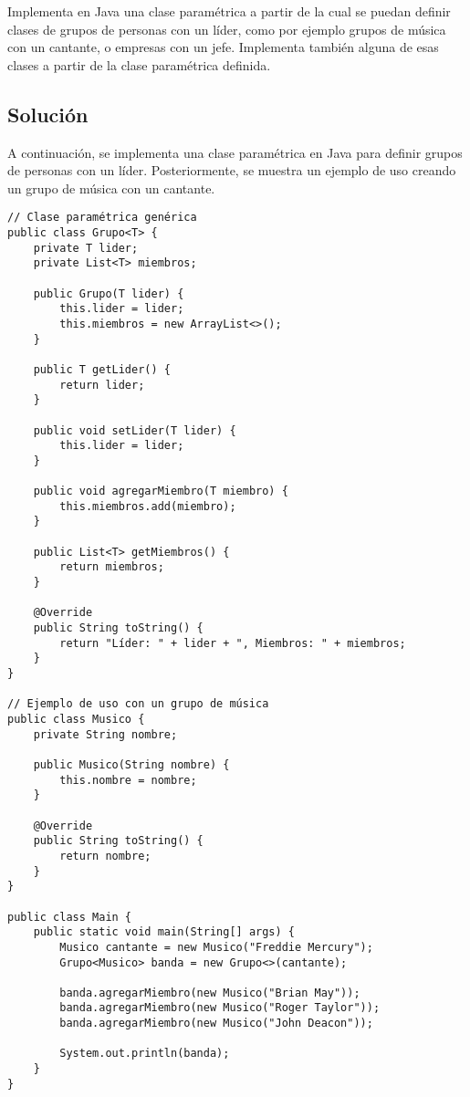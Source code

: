 \documentclass[a4paper,12pt]{article}
\begin{document}
Implementa en Java una clase paramétrica a partir de la cual se puedan definir clases de grupos de personas con un líder, como por ejemplo grupos de música con un cantante, o empresas con un jefe. Implementa también alguna de esas clases a partir de la clase paramétrica definida.

\subsection{Solución}

A continuación, se implementa una clase paramétrica en Java para definir grupos de personas con un líder. Posteriormente, se muestra un ejemplo de uso creando un grupo de música con un cantante.

\begin{lstlisting}[style=customjava]
// Clase paramétrica genérica
public class Grupo<T> {
    private T lider;
    private List<T> miembros;

    public Grupo(T lider) {
        this.lider = lider;
        this.miembros = new ArrayList<>();
    }

    public T getLider() {
        return lider;
    }

    public void setLider(T lider) {
        this.lider = lider;
    }

    public void agregarMiembro(T miembro) {
        this.miembros.add(miembro);
    }

    public List<T> getMiembros() {
        return miembros;
    }

    @Override
    public String toString() {
        return "Líder: " + lider + ", Miembros: " + miembros;
    }
}

// Ejemplo de uso con un grupo de música
public class Musico {
    private String nombre;

    public Musico(String nombre) {
        this.nombre = nombre;
    }

    @Override
    public String toString() {
        return nombre;
    }
}

public class Main {
    public static void main(String[] args) {
        Musico cantante = new Musico("Freddie Mercury");
        Grupo<Musico> banda = new Grupo<>(cantante);
        
        banda.agregarMiembro(new Musico("Brian May"));
        banda.agregarMiembro(new Musico("Roger Taylor"));
        banda.agregarMiembro(new Musico("John Deacon"));

        System.out.println(banda);
    }
}
\end{lstlisting}
\end{document}
